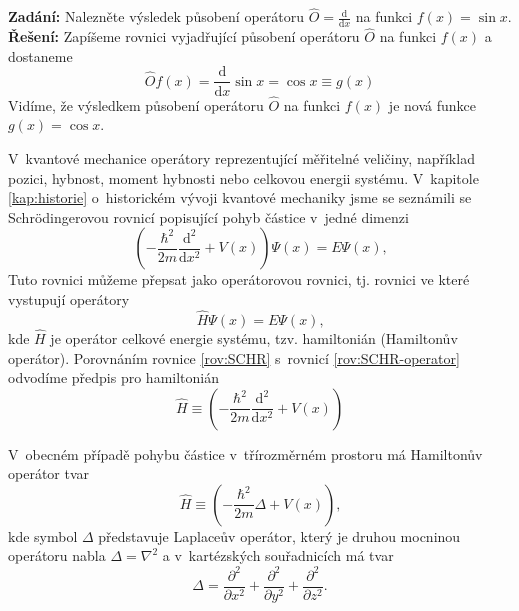 \begin{priklad} \label{pr:Operator}
\textbf{Zadání:} Nalezněte výsledek působení operátoru $\hat{O}=\frac{\mathrm{d}}{\mathrm{d}x}$ na funkci $f(x) = \sin x$. \\
\textbf{Řešení:} Zapíšeme rovnici vyjadřující působení operátoru $\hat{O}$ na funkci $f(x)$ a dostaneme
\begin{displaymath}
\hat{O} f(x) = \frac{\mathrm{d}}{\mathrm{d}x} \sin x = \cos x \equiv g(x)
\end{displaymath}
Vidíme, že výsledkem působení operátoru $\hat{O}$ na funkci $f(x)$ je nová funkce $g(x) = \cos x$.
\end{priklad}

V~kvantové mechanice operátory reprezentující měřitelné veličiny, například pozici, hybnost, moment hybnosti nebo celkovou energii systému. V~kapitole \ref{kap:historie} o~historickém vývoji kvantové mechaniky jsme se seznámili se Schrödingerovou rovnicí popisující pohyb částice v~jedné dimenzi
\begin{equation}
\left( -\frac{\hbar^2}{2m}\frac{\mathrm{d}^2}{\mathrm{d} x^2} + V(x) \right) \Psi(x) = E \Psi(x) \mbox{,}
\label{rov:SCHR}
\end{equation}
Tuto rovnici můžeme přepsat jako operátorovou rovnici, tj. rovnici ve které vystupují operátory
\begin{equation}
\hat{H}\Psi(x) = E \Psi(x)\mbox{,}
\label{rov:SCHR-operator}
\end{equation}
kde $\hat{H}$ je operátor celkové energie systému, tzv. hamiltonián (Hamiltonův operátor). Porovnáním rovnice \eqref{rov:SCHR} s~rovnicí \eqref{rov:SCHR-operator} odvodíme předpis pro hamiltonián
\begin{equation}
\hat{H} \equiv \left( -\frac{\hbar^2}{2m}\frac{\mathrm{d}^2}{\mathrm{d} x^2} + V(x) \right)
\label{rov:Hamiltonian1D}
\end{equation}

V~obecném případě pohybu částice v~třírozměrném prostoru má Hamiltonův operátor tvar
\begin{equation}
\hat{H} \equiv \left( -\frac{\hbar^2}{2m}\Delta + V(x) \right) \mbox{,}
\label{rov:Hamiltonian3D}
\end{equation}
kde symbol $\Delta$ představuje Laplaceův operátor, který je druhou mocninou operátoru nabla $\Delta = \nabla^2$  a v~kartézských souřadnicích má tvar
\begin{equation}
\Delta = \frac{\partial^2}{\partial x^2}+\frac{\partial^2}{\partial y^2}+\frac{\partial^2}{\partial z^2} \mbox{.}
\label{rov:LaplaceuvOperator}
\end{equation}

